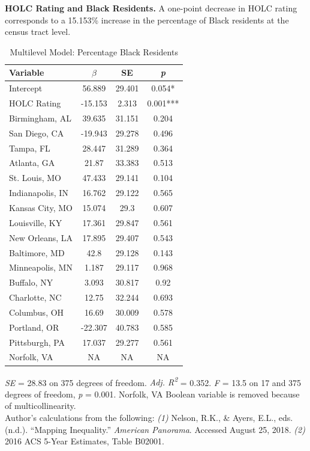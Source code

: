 \documentclass[paper=letter, fontsize=12pt]{scrartcl} %
\begin{document}
\begin{table}
	\textbf{HOLC Rating and Black Residents.} A one-point decrease in HOLC rating corresponds to a 15.153\% increase in the percentage of Black residents at the census tract level.
	\caption{Multilevel Model: Percentage Black Residents}
	\begin{center}
		\begin{tabular}{|| l | c c c ||}
			\hline
			Variable & $\beta$ & SE & \textit{p}\\
			\hline \hline
			Intercept & 56.889 & 29.401 & 0.054*\\ 
			\hline 
			HOLC Rating & -15.153 & 2.313 & 0.001***\\ 
			\hline 
			Birmingham, AL & 39.635 & 31.151 & 0.204\\ 
			\hline 
			San Diego, CA & -19.943 & 29.278 & 0.496\\ 
			\hline 
			Tampa, FL & 28.447 & 31.289 & 0.364\\ 
			\hline 
			Atlanta, GA & 21.87 & 33.383 & 0.513\\ 
			\hline 
			St. Louis, MO & 47.433 & 29.141 & 0.104\\ 
			\hline 
			Indianapolis, IN & 16.762 & 29.122 & 0.565\\ 
			\hline 
			Kansas City, MO & 15.074 & 29.3 & 0.607\\ 
			\hline 
			Louisville, KY & 17.361 & 29.847 & 0.561\\ 
			\hline 
			New Orleans, LA & 17.895 & 29.407 & 0.543\\ 
			\hline 
			Baltimore, MD & 42.8 & 29.128 & 0.143\\ 
			\hline 
			Minneapolis, MN & 1.187 & 29.117 & 0.968\\ 
			\hline 
			Buffalo, NY & 3.093 & 30.817 & 0.92\\ 
			\hline 
			Charlotte, NC & 12.75 & 32.244 & 0.693\\ 
			\hline 
			Columbus, OH & 16.69 & 30.009 & 0.578\\ 
			\hline 
			Portland, OR & -22.307 & 40.783 & 0.585\\ 
			\hline 
			Pittsburgh, PA & 17.037 & 29.277 & 0.561\\ 
			\hline 
			Norfolk, VA & NA & NA & NA\\ 
			\hline
		\end{tabular}
	\end{center}
\textit{SE} = 28.83 on 375 degrees of freedom. \textit{Adj. R\textsuperscript{2}} = 0.352. \textit{F} = 13.5 on 17 and 375 degrees of freedom, \textit{p} = 0.001. Norfolk, VA Boolean variable is removed because of multicollinearity.\\
Author's calculations from the following: \textit{(1)} Nelson, R.K., \& Ayers, E.L., eds. (n.d.). ``Mapping Inequality.'' \textit{American Panorama}. Accessed August 25, 2018. \textit{(2)} 2016 ACS 5-Year Estimates, Table B02001.
\end{table}
\end{document}
